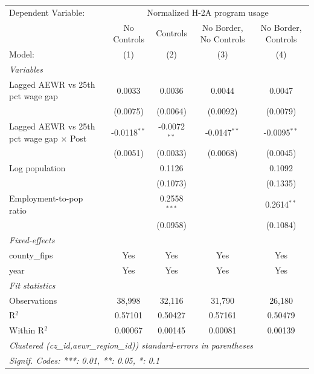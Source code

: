 
\begingroup
\centering
\begin{tabular}{lcccc}
   \tabularnewline \midrule \midrule
   Dependent Variable: & \multicolumn{4}{c}{Normalized H-2A program usage}\\
                                                   & No Controls    & Controls       & No Border, No Controls & No Border, Controls \\   
   Model:                                          & (1)            & (2)            & (3)                    & (4)\\  
   \midrule
   \emph{Variables}\\
   Lagged AEWR vs 25th pct wage gap                & 0.0033         & 0.0036         & 0.0044                 & 0.0047\\   
                                                   & (0.0075)       & (0.0064)       & (0.0092)               & (0.0079)\\   
   Lagged AEWR vs 25th pct wage gap $\times$ Post  & -0.0118$^{**}$ & -0.0072$^{**}$ & -0.0147$^{**}$         & -0.0095$^{**}$\\   
                                                   & (0.0051)       & (0.0033)       & (0.0068)               & (0.0045)\\   
   Log population                                  &                & 0.1126         &                        & 0.1092\\   
                                                   &                & (0.1073)       &                        & (0.1335)\\   
   Employment-to-pop ratio                         &                & 0.2558$^{***}$ &                        & 0.2614$^{**}$\\   
                                                   &                & (0.0958)       &                        & (0.1084)\\   
   \midrule
   \emph{Fixed-effects}\\
   county\_fips                                    & Yes            & Yes            & Yes                    & Yes\\  
   year                                            & Yes            & Yes            & Yes                    & Yes\\  
   \midrule
   \emph{Fit statistics}\\
   Observations                                    & 38,998         & 32,116         & 31,790                 & 26,180\\  
   R$^2$                                           & 0.57101        & 0.50427        & 0.57161                & 0.50479\\  
   Within R$^2$                                    & 0.00067        & 0.00145        & 0.00081                & 0.00139\\  
   \midrule \midrule
   \multicolumn{5}{l}{\emph{Clustered (cz\_id,aewr\_region\_id)) standard-errors in parentheses}}\\
   \multicolumn{5}{l}{\emph{Signif. Codes: ***: 0.01, **: 0.05, *: 0.1}}\\
\end{tabular}
\par\endgroup


